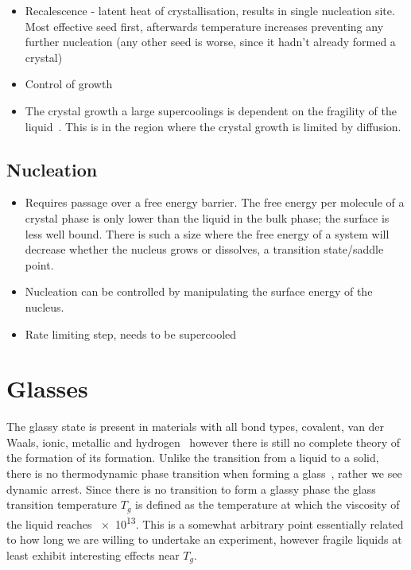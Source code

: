 {\begin{itemize}
    \item Recalescence - latent heat of crystallisation, results in single nucleation site.~\cite{turnbull:69} Most effective seed first, afterwards temperature increases preventing any further nucleation (any other seed is worse, since it hadn't already formed a crystal)

    \item Control of growth~\cite{de-yoreo:03}

    \item The crystal growth a large supercoolings is dependent on the fragility of the liquid~\cite{ediger:08}. This is in the region where the crystal growth is limited by diffusion. 

\end{itemize}

\subsection{Nucleation}

\begin{itemize}

    \item Requires passage over a free energy barrier. The free energy per molecule of a crystal phase is only lower than the liquid in the bulk phase; the surface is less well bound. There is such a size where the free energy of a system will decrease whether the nucleus grows or dissolves, a transition state/saddle point.

    \item Nucleation can be controlled by manipulating the surface energy of the nucleus.~\cite{de-yoreo:03}
 
    \item Rate limiting step, needs to be supercooled

\end{itemize}

\section{Glasses}

The glassy state is present in materials with all bond types, covalent, van der Waals, ionic, metallic and hydrogen~\cite{turnbull:69} however there is still no complete theory of the formation of its formation. Unlike the transition from a liquid to a solid, there is no thermodynamic phase transition when forming a glass~\cite{santen:00}, rather we see dynamic arrest. Since there is no transition to form a glassy phase the glass transition temperature $T_g$ is defined as the temperature at which the viscosity of the liquid reaches \SI{e13}{\poise}. This is a somewhat arbitrary point essentially related to how long we are willing to undertake an experiment, however fragile liquids at least exhibit interesting effects near $T_g$.

}
